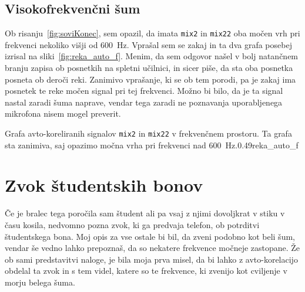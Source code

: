 \documentclass{porocilo}
\begin{document}

\subsection{Visokofrekvenčni šum}
Ob risanju~\ref{fig:soviKonec}, sem opazil, da imata {\tt mix2} in {\tt mix22} oba močen vrh pri frekvenci nekoliko višji od \SI{600}{\hertz}. Vprašal sem se zakaj in ta dva grafa posebej izrisal na sliki~\ref{fig:reka_auto_f}. Menim, da sem odgovor našel v bolj natančnem branju zapisa ob posnetkih na spletni učilnici, in sicer piše, da sta oba posnetka posneta ob deroči reki. Zanimivo vprašanje, ki se ob tem porodi, pa je zakaj ima posnetek te reke močen signal pri tej frekvenci. Možno bi bilo, da je ta signal nastal zaradi šuma naprave, vendar tega zaradi ne poznavanja uporabljenega mikrofona nisem mogel preverit.

\begin{multifig}{2}{Grafa avto-koreliranih signalov {\tt mix2} in {\tt mix22} v frekvenčnem prostoru. Ta grafa sta zanimiva, saj opazimo močna vrha pri frekvenci nad \SI{600}{\hertz}.}{0.49}{reka_auto_f}
\end{multifig}

\section{Zvok študentskih bonov}
Če je bralec tega poročila sam študent ali pa vsaj z njimi dovoljkrat v stiku v času kosila, nedvomno pozna zvok, ki ga predvaja telefon, ob potrditvi študentskega bona. Moj opis za vse ostale bi bil, da zveni podobno kot beli šum, vendar še vedno lahko prepoznaš, da so nekatere frekvence močneje zastopane. Že ob sami predstavitvi naloge, je bila moja prva misel, da bi lahko z avto-korelacijo obdelal ta zvok in s tem videl, katere so te frekvence, ki zvenijo kot cviljenje v morju belega šuma.
\end{document}
